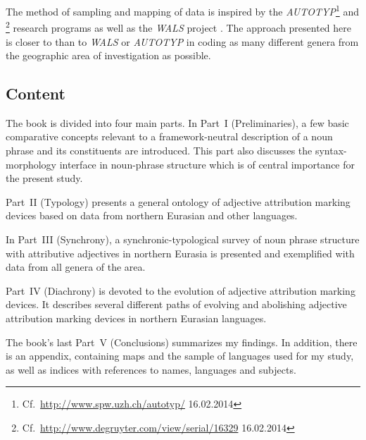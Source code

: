 The method of sampling and mapping of data is inspired by the \emph{AUTOTYP}\footnote{Cf.~\url{http://www.spw.uzh.ch/autotyp/} 16.02.2014} and \emph{}\footnote{Cf.~\url{http://www.degruyter.com/view/serial/16329} 16.02.2014} research programs as well as the \emph{WALS} project \citep{walsOnline2013}. The approach presented here is closer to \emph{} than to \emph{WALS} or \emph{AUTOTYP} in coding as many different genera from the geographic area of investigation as possible.

\subsection*{Content}
The book is divided into four main parts. In Part~I (Preliminaries), a few basic comparative concepts relevant to a framework-neutral description of a noun phrase and its constituents are introduced. This part also discusses the syntax-morphology interface in noun-phrase structure which is of central importance for the present study.

Part~II (Typology) presents a general ontology of adjective attribution marking devices based on data from northern Eurasian and other languages.

In Part~III (Synchrony), a synchronic-typological survey of noun phrase structure with attributive adjectives in northern Eurasia is presented and exemplified with data from all genera of the area.

Part~IV (Diachrony) is devoted to the evolution of adjective attribution marking devices. It describes several different paths of evolving and abolishing adjective attribution marking devices in northern Eurasian languages.

The book's last Part~V (Conclusions) summarizes my findings. In addition, there is an appendix, containing maps and the sample of languages used for my study, as well as indices with references to names, languages and subjects.
